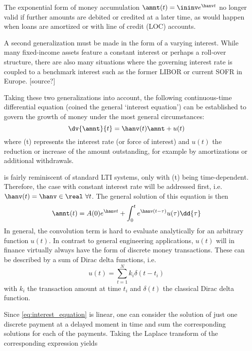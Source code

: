 The exponential form of money accumulation \(\amnt(t) = \ininv e^{\hanv t}\) no longer valid if further amounts are debited or credited at a later time, as would happen when loans are amortized or with line of credit (LOC) accounts. 

A second generalization must be made in the form of a varying interest. While many fixed-income assets feature a constant interest or perhaps a roll-over structure, there are also many situations where the governing interest rate is coupled to a benchmark interest such as the former LIBOR or current SOFR in Europe. [source?]

Taking these two generalizations into account, the following continuous-time differential equation (coined the general `interest equation') can be established to govern the growth of money under the most general circumstances:
\begin{equation}
    \dv{\amnt}{t} = \hanv(t) \amnt + u(t)
    \label{eq:interest_equation}
\end{equation}
where \hanv(t) represents the interest rate (or force of interest) and \(u(t)\) the reduction or increase of the amount outstanding, for example by amortizations or additional withdrawals. 

 is fairly reminiscent of standard LTI systems, only with \hanv(t) being time-dependent. Therefore, the case with constant interest rate will be addressed first, i.e. \(\hanv(t) = \hanv \in \real \ \forall t\). The general solution of this equation is then
\begin{equation}
    \amnt(t) = A(0)e^{\hanv t} + \int_0^t e^{\hanv (t - \tau)} u(\tau )\dd{\tau}
\end{equation}
In general, the convolution term is hard to evaluate analytically for an arbitrary function \(u(t)\). In contrast to general engineering applications, \(u(t)\) will in finance virtually always have the form of discrete money transactions. These can be described by a sum of Dirac delta functions, i.e. 
\begin{equation}
    u(t) = \sum^N_{t=1} k_i \delta(t - t_i)
\end{equation}
with \(k_i\) the transaction amount at time \(t_i\) and \(\delta(t)\) the classical Dirac delta function.

Since \cref{eq:interest_equation} is linear, one can consider the solution of just one discrete payment at a delayed moment in time and sum the corresponding solutions for each of the payments. Taking the Laplace transform of the corresponding expression yields

